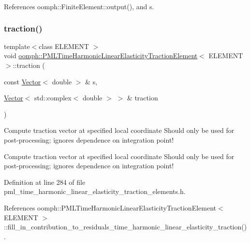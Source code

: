 References oomph\+::\+Finite\+Element\+::output(), and s.

\mbox{\label{classoomph_1_1PMLTimeHarmonicLinearElasticityTractionElement_ae83042121b4033f28c95ca8899b02ee8}} 
\subsubsection{\texorpdfstring{traction()}{traction()}}
{\footnotesize\ttfamily template$<$class E\+L\+E\+M\+E\+NT $>$ \\
void \hyperlink{classoomph_1_1PMLTimeHarmonicLinearElasticityTractionElement}{oomph\+::\+P\+M\+L\+Time\+Harmonic\+Linear\+Elasticity\+Traction\+Element}$<$ E\+L\+E\+M\+E\+NT $>$\+::traction (\begin{DoxyParamCaption}\item[{const \hyperlink{classoomph_1_1Vector}{Vector}$<$ double $>$ \&}]{s,  }\item[{\hyperlink{classoomph_1_1Vector}{Vector}$<$ std\+::complex$<$ double $>$ $>$ \&}]{traction }\end{DoxyParamCaption})}



Compute traction vector at specified local coordinate Should only be used for post-\/processing; ignores dependence on integration point! 

Compute traction vector at specified local coordinate Should only be used for post-\/processing; ignores dependence on integration point! 

Definition at line 284 of file pml\+\_\+time\+\_\+harmonic\+\_\+linear\+\_\+elasticity\+\_\+traction\+\_\+elements.\+h.



References oomph\+::\+P\+M\+L\+Time\+Harmonic\+Linear\+Elasticity\+Traction\+Element$<$ E\+L\+E\+M\+E\+N\+T $>$\+::fill\+\_\+in\+\_\+contribution\+\_\+to\+\_\+residuals\+\_\+time\+\_\+harmonic\+\_\+linear\+\_\+elasticity\+\_\+traction().

\mbox{\label{classoomph_1_1PMLTimeHarmonicLinearElasticityTractionElement_a035a8fcd22c01966f16e83e7c3517569}} 
